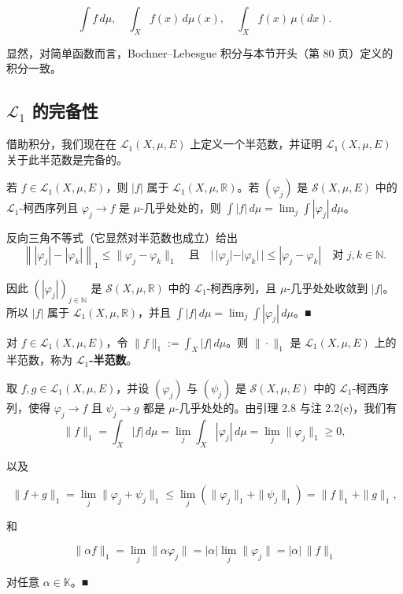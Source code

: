 \[
\int f \, d\mu , \quad \int_X f(x) \, d\mu(x) , \quad \int_X f(x) \, \mu(dx) .
\]

显然，对简单函数而言，Bochner–Lebesgue 积分与本节开头（第 80 页）定义的积分一致。

\subsection*{$ \mathcal{L}_1 $ 的完备性}

借助积分，我们现在在 $ \mathcal{L}_1(X,\mu,E) $ 上定义一个半范数，并证明 $ \mathcal{L}_1(X,\mu,E) $ 关于此半范数是完备的。

\begin{lemma}

若 $ f \in \mathcal{L}_1(X,\mu,E) $，则 $ |f| $ 属于 $ \mathcal{L}_1(X,\mu,\mathbb{R}) $。若 $ (\varphi_j) $ 是 $ \mathcal{S}(X,\mu,E) $ 中的 $ \mathcal{L}_1 $-柯西序列且 $ \varphi_j \to f $ 是 $ \mu $-几乎处处的，则 $ \int |f| \, d\mu = \lim_j \int |\varphi_j| \, d\mu $。

\proofhead
反向三角不等式（它显然对半范数也成立）给出
\[
\left\| |\varphi_j| - |\varphi_k| \right\|_1 \le \|\varphi_j - \varphi_k\|_1 \quad \text{且} \quad |\,|\varphi_j| - |\varphi_k|\,| \le |\varphi_j - \varphi_k| \quad \text{对 } j, k \in \mathbb{N} .
\]

因此 $ (|\varphi_j|)_{j \in \mathbb{N}} $ 是 $ \mathcal{S}(X,\mu,\mathbb{R}) $ 中的 $ \mathcal{L}_1 $-柯西序列，且 $ \mu $-几乎处处收敛到 $ |f| $。所以 $ |f| $ 属于 $ \mathcal{L}_1(X,\mu,\mathbb{R}) $，并且 $ \int |f| \, d\mu = \lim_j \int |\varphi_j| \, d\mu $。\nobreak\hspace{0.35em}■

\end{lemma}

\begin{corollary}

对 $ f \in \mathcal{L}_1(X,\mu,E) $，令 $ \|f\|_1 := \int_X |f| \, d\mu $。则 $ \|\cdot\|_1 $ 是 $ \mathcal{L}_1(X,\mu,E) $ 上的半范数，称为 \textbf{$ \mathcal{L}_1 $-半范数}。

\proofhead
取 $ f, g \in \mathcal{L}_1(X,\mu,E) $，并设 $ (\varphi_j) $ 与 $ (\psi_j) $ 是 $ \mathcal{S}(X,\mu,E) $ 中的 $ \mathcal{L}_1 $-柯西序列，使得 $ \varphi_j \to f $ 且 $ \psi_j \to g $ 都是 $ \mu $-几乎处处的。由引理 2.8 与注 2.2(c)，我们有
\[
\|f\|_1 = \int_X |f| \, d\mu = \lim_j \int_X |\varphi_j| \, d\mu = \lim_j \|\varphi_j\|_1 \ge 0 ,
\]

以及

\[
\|f + g\|_1 = \lim_j \|\varphi_j + \psi_j\|_1 \le \lim_j (\|\varphi_j\|_1 + \|\psi_j\|_1) = \|f\|_1 + \|g\|_1 ,
\]

和

\[
\|\alpha f\|_1 = \lim_j \|\alpha \varphi_j\| = |\alpha| \lim_j \|\varphi_j\| = |\alpha| \, \|f\|_1
\]

对任意 $ \alpha \in \mathbb{K} $。\nobreak\hspace{0.35em}■

\end{corollary}

